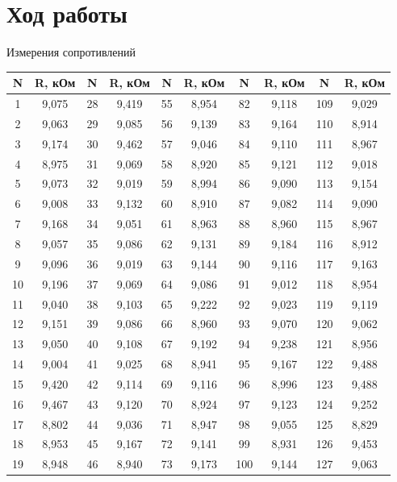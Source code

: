 \documentclass[a4paper, 12pt]{article}
\begin{document}
	\section*{Ход работы}
		Измерения сопротивлений
		\begin{longtable}[H]{|c|c|c|c|c|c|c|c|c|c|}
			\hline
			N & R, кОм & N & R, кОм & N & R, кОм & N & R, кОм & N & R, кОм \\
			\hline
			1 & 9,075 & 28 & 9,419 & 55 & 8,954 & 82 & 9,118 & 109 & 9,029 \\
			\hline
			2 & 9,063 & 29 & 9,085 & 56 & 9,139 & 83 & 9,164 & 110 & 8,914 \\
			\hline
			3 & 9,174 & 30 & 9,462 & 57 & 9,046 & 84 & 9,110 & 111 & 8,967 \\
			\hline
			4 & 8,975 & 31 & 9,069 & 58 & 8,920 & 85 & 9,121 & 112 & 9,018 \\
			\hline
			5 & 9,073 & 32 & 9,019 & 59 & 8,994 & 86 & 9,090 & 113 & 9,154 \\
			\hline
			6 & 9,008 & 33 & 9,132 & 60 & 8,910 & 87 & 9,082 & 114 & 9,090 \\
			\hline
			7 & 9,168 & 34 & 9,051 & 61 & 8,963 & 88 & 8,960 & 115 & 8,967 \\
			\hline
			8 & 9,057 & 35 & 9,086 & 62 & 9,131 & 89 & 9,184 & 116 & 8,912 \\
			\hline
			9 & 9,096 & 36 & 9,019 & 63 & 9,144 & 90 & 9,116 & 117 & 9,163 \\
			\hline
			10 & 9,196 & 37 & 9,069 & 64 & 9,086 & 91 & 9,012 & 118 & 8,954 \\
			\hline
			11 & 9,040 & 38 & 9,103 & 65 & 9,222 & 92 & 9,023 & 119 & 9,119 \\
			\hline
			12 & 9,151 & 39 & 9,086 & 66 & 8,960 & 93 & 9,070 & 120 & 9,062 \\
			\hline
			13 & 9,050 & 40 & 9,108 & 67 & 9,192 & 94 & 9,238 & 121 & 8,956 \\
			\hline
			14 & 9,004 & 41 & 9,025 & 68 & 8,941 & 95 & 9,167 & 122 & 9,488 \\
			\hline
			15 & 9,420 & 42 & 9,114 & 69 & 9,116 & 96 & 8,996 & 123 & 9,488 \\
			\hline
			16 & 9,467 & 43 & 9,120 & 70 & 8,924 & 97 & 9,123 & 124 & 9,252 \\
			\hline
			17 & 8,802 & 44 & 9,036 & 71 & 8,947 & 98 & 9,055 & 125 & 8,829 \\
			\hline
			18 & 8,953 & 45 & 9,167 & 72 & 9,141 & 99 & 8,931 & 126 & 9,453 \\
			\hline
			19 & 8,948 & 46 & 8,940 & 73 & 9,173 & 100 & 9,144 & 127 & 9,063 \\

\end{longtable}
\end{document}
